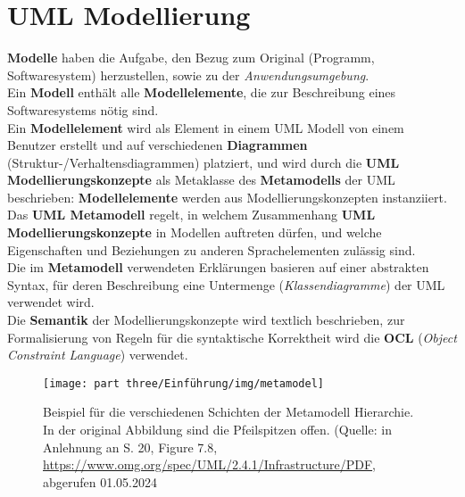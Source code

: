 \section{UML Modellierung}

\begin{tcolorbox}[title=UML Modellierung]
    \textbf{Modelle} haben die Aufgabe, den Bezug zum Original (Programm, Softwaresystem) herzustellen, sowie zu der \textit{Anwendungsumgebung}.\\
    Ein \textbf{Modell} enthält alle \textbf{Modellelemente}, die zur Beschreibung eines Softwaresystems nötig sind.\\

    \noindent
    Ein \textbf{Modellelement} wird als Element in einem UML Modell von einem Benutzer erstellt und auf verschiedenen \textbf{Diagrammen} (Struktur-/Verhaltensdiagrammen) platziert, und wird durch die \textbf{UML Modellierungskonzepte} als Metaklasse des \textbf{Metamodells} der UML beschrieben: \textbf{Modellelemente} werden aus Modellierungskonzepten instanziiert.\\

    \noindent
       Das \textbf{UML Metamodell} regelt, in welchem Zusammenhang \textbf{UML Modellierungskonzepte} in Modellen auftreten dürfen, und welche Eigenschaften und Beziehungen zu anderen Sprachelementen zulässig sind.\\

       \noindent
       Die im \textbf{Metamodell} verwendeten Erklärungen basieren auf einer abstrakten Syntax, für deren Beschreibung eine Untermenge (\textit{Klassendiagramme}) der UML verwendet wird.\\
        Die \textbf{Semantik} der Modellierungskonzepte wird textlich beschrieben, zur Formalisierung von Regeln für die syntaktische Korrektheit wird die \textbf{OCL} (\textit{Object Constraint Language}) verwendet.
\end{tcolorbox}

\begin{figure}
    \centering
    \texttt{[image: part three/Einführung/img/metamodel]}
    \caption{Beispiel für die verschiedenen Schichten der Metamodell Hierarchie.
        In der original Abbildung sind die Pfeilspitzen offen. (Quelle: in Anlehnung an S. 20, Figure 7.8, \url{https://www.omg.org/spec/UML/2.4.1/Infrastructure/PDF}, abgerufen 01.05.2024}
    \label{fig:metamodel-cc}
\end{figure}
